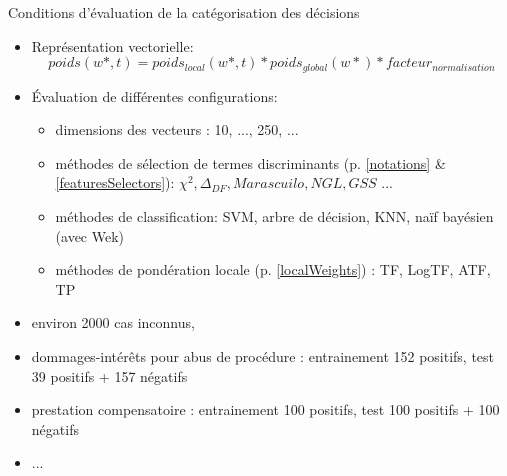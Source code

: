\documentclass[newPxFont,pagenumber]{beamer}
\begin{document}
\begin{frame}{Conditions d'évaluation de la catégorisation des décisions}

\begin{itemize}
\item Représentation vectorielle: {\small \[ poids(w*, t) = poids_{local}(w*, t) * poids_{global}(w*) * facteur_{normalisation}\]}
\item Évaluation de différentes configurations:
\begin{itemize}
\item dimensions des vecteurs : 10, ..., 250, ...
\item méthodes de sélection de termes discriminants (p. \ref{notations} \& \ref{featuresSelectors}): $\chi^2, \Delta_{DF}, Marascuilo, NGL, GSS $  ...
\item méthodes de classification: SVM, arbre de décision, KNN, naïf bayésien (avec Wek)
\item méthodes de pondération locale (p. \ref{localWeights}) : TF, LogTF, ATF, TP
\end{itemize}
\item environ 2000 cas inconnus, 
\item dommages-intérêts pour abus de procédure : entrainement 152 positifs, test 39 positifs + 157 négatifs
\item prestation compensatoire : entrainement 100 positifs, test 100 positifs + 100 négatifs
\item ...
\end{itemize}
\end{frame}
\end{document}
